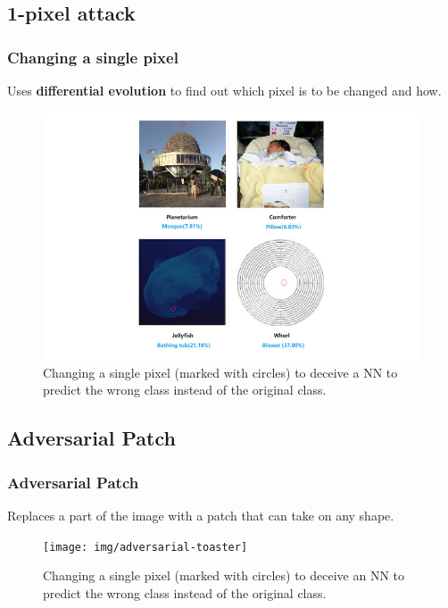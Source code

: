 \documentclass[12pt]{beamer}
\begin{document}
\subsection{1-pixel attack}
\begin{frame}
\frametitle{Changing a single pixel}
Uses \textbf{differential evolution} to find out which pixel is to be changed and how.
\begin{figure}
	\centering
	\includegraphics[width=0.8\linewidth,height=0.6\textheight]{img/adversarial-1pixel}
	\caption{Changing a single pixel (marked with circles) to deceive a NN to predict the wrong class instead of the original class.\protect\footnotemark}
	\label{fig:adversarial-1pixel}
\end{figure}


\end{frame}

\subsection{Adversarial Patch}
\begin{frame}
\frametitle{Adversarial Patch}
Replaces a part of the image with a patch that can take on any shape.

\begin{figure}
	\centering
	\texttt{[image: img/adversarial-toaster]}
	\caption{Changing a single pixel (marked with circles) to deceive an NN to predict the wrong class instead of the original class.\protect\footnotemark}
	\label{fig:adversarial-patch}
\end{figure}

\end{frame}
\end{document}

